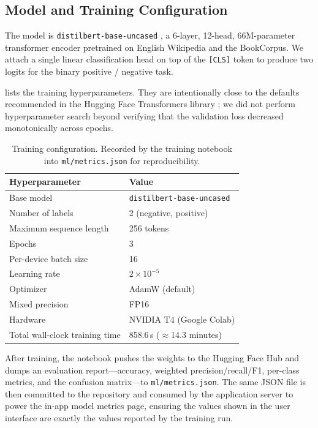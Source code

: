\documentclass[11pt, a4paper]{article}
\begin{document}
\subsection{Model and Training Configuration}

The model is \texttt{distilbert-base-uncased} \citep{sanh2019distilbert}, a 6-layer, 12-head, 66M-parameter transformer encoder pretrained on English Wikipedia and the BookCorpus. We attach a single linear classification head on top of the \texttt{[CLS]} token to produce two logits for the binary positive / negative task.

 lists the training hyperparameters. They are intentionally close to the defaults recommended in the Hugging Face Transformers library \citep{wolf2020transformers}; we did not perform hyperparameter search beyond verifying that the validation loss decreased monotonically across epochs.

\begin{table}[ht]
\centering
\small
\begin{tabular}{l l}
\toprule
\textbf{Hyperparameter} & \textbf{Value} \\
\midrule
Base model & \texttt{distilbert-base-uncased} \\
Number of labels & 2 (negative, positive) \\
Maximum sequence length & 256 tokens \\
Epochs & 3 \\
Per-device batch size & 16 \\
Learning rate & $2 \times 10^{-5}$ \\
Optimizer & AdamW (default) \\
Mixed precision & FP16 \\
Hardware & NVIDIA T4 (Google Colab) \\
Total wall-clock training time & 858.6\,s ($\approx$14.3 minutes) \\
\bottomrule
\end{tabular}
\caption{Training configuration. Recorded by the training notebook into \texttt{ml/metrics.json} for reproducibility.}
\label{tab:hparams}
\end{table}

After training, the notebook pushes the weights to the Hugging Face Hub and dumps an evaluation report---accuracy, weighted precision/recall/F1, per-class metrics, and the confusion matrix---to \texttt{ml/metrics.json}. The same JSON file is then committed to the repository and consumed by the application server to power the in-app model metrics page, ensuring the values shown in the user interface are exactly the values reported by the training run.
\end{document}
